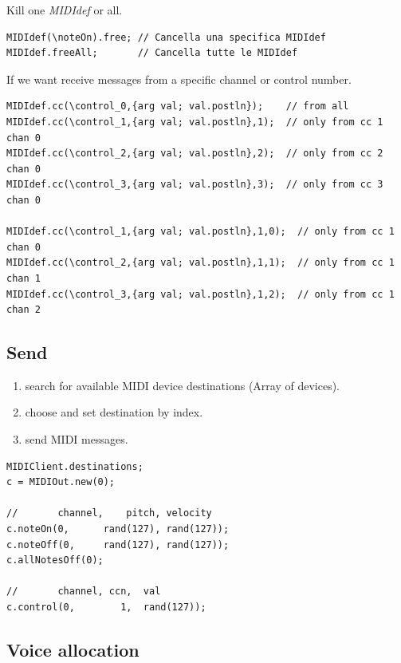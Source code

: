 Kill one \textit{MIDIdef} or all. 
\begin{lstlisting}[frame=single] 
MIDIdef(\noteOn).free; // Cancella una specifica MIDIdef
MIDIdef.freeAll;       // Cancella tutte le MIDIdef
\end{lstlisting} 

If we want receive messages from a specific channel or control number.

\begin{lstlisting}[frame=single] 
MIDIdef.cc(\control_0,{arg val; val.postln});    // from all 
MIDIdef.cc(\control_1,{arg val; val.postln},1);  // only from cc 1 chan 0
MIDIdef.cc(\control_2,{arg val; val.postln},2);  // only from cc 2 chan 0
MIDIdef.cc(\control_3,{arg val; val.postln},3);  // only from cc 3 chan 0

MIDIdef.cc(\control_1,{arg val; val.postln},1,0);  // only from cc 1 chan 0
MIDIdef.cc(\control_2,{arg val; val.postln},1,1);  // only from cc 1 chan 1
MIDIdef.cc(\control_3,{arg val; val.postln},1,2);  // only from cc 1 chan 2
\end{lstlisting} 


\subsection{Send}\label{send-midi}

\begin{enumerate}
\def\labelenumi{\arabic{enumi}.}
\tightlist
\item search for available MIDI device destinations (Array of devices).
\item choose and set destination by index.
\item send MIDI messages.
\end{enumerate}

\begin{lstlisting}[frame=single] 
MIDIClient.destinations; 
c = MIDIOut.new(0);

//       channel,    pitch, velocity
c.noteOn(0,      rand(127), rand(127));
c.noteOff(0,     rand(127), rand(127));
c.allNotesOff(0);

//       channel, ccn,  val
c.control(0,        1,  rand(127));
\end{lstlisting} 

\subsection{Voice allocation}\label{voice-allocation}

